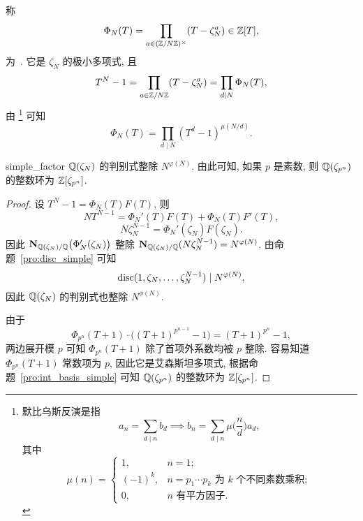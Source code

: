 称 
	\[\Phi_N(T)=\prod_{a\in({\mathbb{Z}}/N{\mathbb{Z}})^\times} (T-\zeta_N^a)\in{\mathbb{Z}}[T],\]
为\ .
它是 $\zeta_N$ 的极小多项式, 且
	\[T^N-1=\prod_{a\in{\mathbb{Z}}/N{\mathbb{Z}}}(T-\zeta_N^a)=\prod_{d\mid N}\Phi_N(T),\]
由%
\footnote{
	默比乌斯反演是指
		\[a_n=\sum_{d\mid n}b_d\implies
		b_n=\sum_{d\mid n}\mu\bigl(\frac nd\bigr)a_d,\]
	其中
	\[\mu(n)=\begin{cases}
		1,&n=1;\\
		(-1)^k,&n=p_1\cdots p_k\text{ 为 $k$ 个不同素数乘积};\\
		0,&n\text{ 有平方因子}.
	\end{cases}\]
}%
可知
	\[\Phi_N(T)=\prod_{d\mid N}(T^d-1)^{\mu(N/d)}.\]

\begin{proposition}{}{simple_factor}
${\mathbb{Q}}(\zeta_N)$ 的判别式整除 $N^{\varphi(N)}$. 由此可知, 如果 $p$ 是素数, 则 ${\mathbb{Q}}(\zeta_{p^n})$ 的整数环为 ${\mathbb{Z}}[\zeta_{p^n}]$.
\end{proposition}
\begin{proof}
设 $T^N-1=\Phi_N(T)F(T)$, 则
	\[NT^{N-1}=\Phi_N'(T)F(T)+\Phi_N(T)F'(T),\]
	\[N\zeta_N^{N-1}=\Phi_N'(\zeta_N)F(\zeta_N).\]
因此 ${\mathbf{N}}_{{\mathbb{Q}}(\zeta_N)/{\mathbb{Q}}}\bigl(\Phi'_N(\zeta_N)\bigr)$ 整除 ${\mathbf{N}}_{{\mathbb{Q}}(\zeta_N)/{\mathbb{Q}}}(N\zeta_N^{N-1})=N^{\varphi(N)}$. 由命题~\ref{pro:disc_simple} 可知 
	\[{\mathrm{disc}}(1,\zeta_N,\dots,\zeta_N^{N-1})\mid N^{\varphi(N)},\] 
因此 ${\mathbb{Q}}(\zeta_N)$ 的判别式也整除 $N^{\phi(N)}$.

由于
	\[\Phi_{p^n}(T+1)\cdot \bigl((T+1)^{p^{n-1}}-1\bigr)=(T+1)^{p^n}-1,\]
两边展开模 $p$ 可知 $\Phi_{p^n}(T+1)$ 除了首项外系数均被 $p$ 整除. 容易知道 $\Phi_{p^n}(T+1)$ 常数项为 $p$, 因此它是艾森斯坦多项式, 根据命题~\ref{pro:int_basis_simple} 可知 ${\mathbb{Q}}(\zeta_{p^n})$ 的整数环为 ${\mathbb{Z}}[\zeta_{p^n}]$.
\end{proof}


